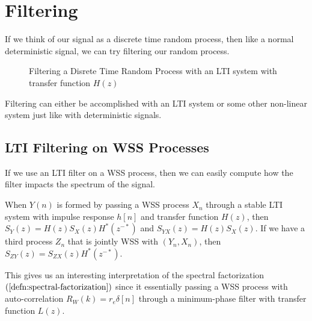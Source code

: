 \section{Filtering}
If we think of our signal as a discrete time random process, then like a normal deterministic signal, we can try filtering our random process.
\begin{gitbook-image}
\begin{figure}[!h]
  \centering
	\caption{Filtering a Disrete Time Random Process with an LTI system with transfer function $H(z)$}
  \label{fig:lti-filtering}
\end{figure}
\end{gitbook-image}
Filtering can either be accomplished with an LTI system or some other non-linear system just like with deterministic signals.
\subsection{LTI Filtering on WSS Processes}
If we use an LTI filter on a WSS process, then we can easily compute how the filter impacts the spectrum of the signal.
\begin{theorem}
	When $Y(n)$ is formed by passing a WSS process $X_n$ through a stable LTI system with impulse response $h[n]$ and transfer function $H(z)$, then $S_Y(z) = H(z)S_X(z)H^*(z^{-*})$ and $S_{YX}(z) = H(z)S_X(z)$.
	If we have a third process $Z_n$ that is jointly WSS with $(Y_n, X_n)$, then $S_{ZY}(z) = S_{ZX}(z)H^*(z^{-*})$.
	\label{thm:lti-process}
\end{theorem}
This gives us an interesting interpretation of the spectral factorization $(\cref{defn:spectral-factorization})$ since it essentially passing a WSS process with auto-correlation $R_W(k) = r_e\delta[n]$ through a minimum-phase filter with transfer function $L(z)$.
